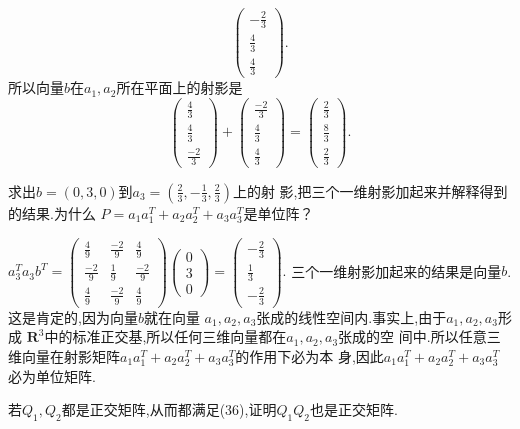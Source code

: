 ﻿\documentclass{book} \usepackage{exsheets} \usepackage{xeCJK}
\begin{document}
\begin{solution}
$$\begin{pmatrix}
  -\frac{2}{3}\\
  \frac{4}{3}\\
  \frac{4}{3}
\end{pmatrix}.
$$
所以向量$b$在$a_1,a_2$所在平面上的射影是
$$
\begin{pmatrix}
  \frac{4}{3}\\
  \frac{4}{3}\\
  \frac{-2}{3}
\end{pmatrix}+
\begin{pmatrix}
  \frac{-2}{3}\\
  \frac{4}{3}\\
  \frac{4}{3}
\end{pmatrix}=
\begin{pmatrix}
  \frac{2}{3}\\
  \frac{8}{3}\\
  \frac{2}{3}
\end{pmatrix}.
$$
\end{solution}
\begin{question}
  求出$b=(0,3,0)$到$a_3=(\frac{2}{3},-\frac{1}{3},\frac{2}{3})$上的射
  影,把三个一维射影加起来并解释得到的结果.为什么
  $P=a_1a_1^T+a_2a_2^T+a_3a_3^{T}$是单位阵？
\end{question}
\begin{solution}
$a_3^Ta_3b^T=
\begin{pmatrix}
  \frac{4}{9}&\frac{-2}{9}&\frac{4}{9}\\
  \frac{-2}{9}&\frac{1}{9}&\frac{-2}{9}\\
  \frac{4}{9}&\frac{-2}{9}&\frac{4}{9}
\end{pmatrix}
\begin{pmatrix}
  0\\
3\\
0
\end{pmatrix}=
\begin{pmatrix}
  -\frac{2}{3}\\
  \frac{1}{3}\\
  -\frac{2}{3}
\end{pmatrix}.
$
三个一维射影加起来的结果是向量$b$.这是肯定的,因为向量$b$就在向量
$a_1,a_2,a_3$张成的线性空间内.事实上,由于$a_1,a_2,a_3$形成
$\mathbf{R}^3$中的标准正交基,所以任何三维向量都在$a_1,a_2,a_3$张成的空
间中.所以任意三维向量在射影矩阵$a_1a_1^T+a_2a_2^T+a_3a_3^T$的作用下必为本
身,因此$a_1a_1^T+a_2a_2^T+a_3a_3^T$必为单位矩阵.
\end{solution}
\begin{question}
  若$Q_1,Q_2$都是正交矩阵,从而都满足(36),证明$Q_1Q_2$也是正交矩阵.
\end{question}
\end{document}
